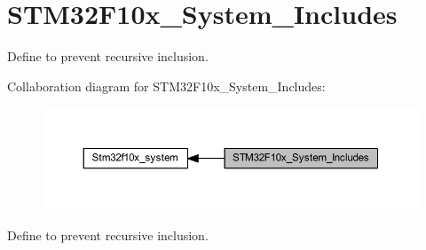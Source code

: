 \hypertarget{group___s_t_m32_f10x___system___includes}{}\section{S\+T\+M32\+F10x\+\_\+\+System\+\_\+\+Includes}
\label{group___s_t_m32_f10x___system___includes}


Define to prevent recursive inclusion.  


Collaboration diagram for S\+T\+M32\+F10x\+\_\+\+System\+\_\+\+Includes\+:
\nopagebreak
\begin{figure}[H]
\begin{center}
\leavevmode
\includegraphics[width=350pt]{group___s_t_m32_f10x___system___includes}
\end{center}
\end{figure}
Define to prevent recursive inclusion. 

